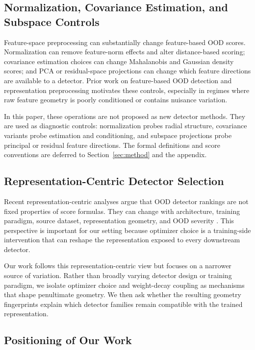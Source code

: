 \subsection{Normalization, Covariance Estimation, and Subspace Controls}
\label{subsec:normalization-covariance-controls}

Feature-space preprocessing can substantially change feature-based OOD scores.
Normalization can remove feature-norm effects and alter distance-based scoring;
covariance estimation choices can change Mahalanobis and Gaussian density scores;
and PCA or residual-space projections can change which feature directions are
available to a detector. Prior work on feature-based OOD detection and
representation preprocessing motivates these controls, especially in regimes
where raw feature geometry is poorly conditioned or contains nuisance variation.

In this paper, these operations are not proposed as new detector methods. They
are used as diagnostic controls: normalization probes radial structure,
covariance variants probe estimation and conditioning, and subspace projections
probe principal or residual feature directions. The formal definitions and score
conventions are deferred to Section~\ref{sec:method} and the appendix.

\subsection{Representation-Centric Detector Selection}
\label{subsec:representation-centric-detector-selection}

Recent representation-centric analyses argue that OOD detector rankings are not
fixed properties of score formulas. They can change with architecture, training
paradigm, source dataset, representation geometry, and OOD severity
\citep{olivares2025systematic}. This perspective is important for our setting
because optimizer choice is a training-side intervention that can reshape the
representation exposed to every downstream detector.

Our work follows this representation-centric view but focuses on a narrower
source of variation. Rather than broadly varying detector design or training
paradigm, we isolate optimizer choice and weight-decay coupling as mechanisms
that shape penultimate geometry. We then ask whether the resulting geometry
fingerprints explain which detector families remain compatible with the trained
representation.

\subsection{Positioning of Our Work}
\label{subsec:positioning}

